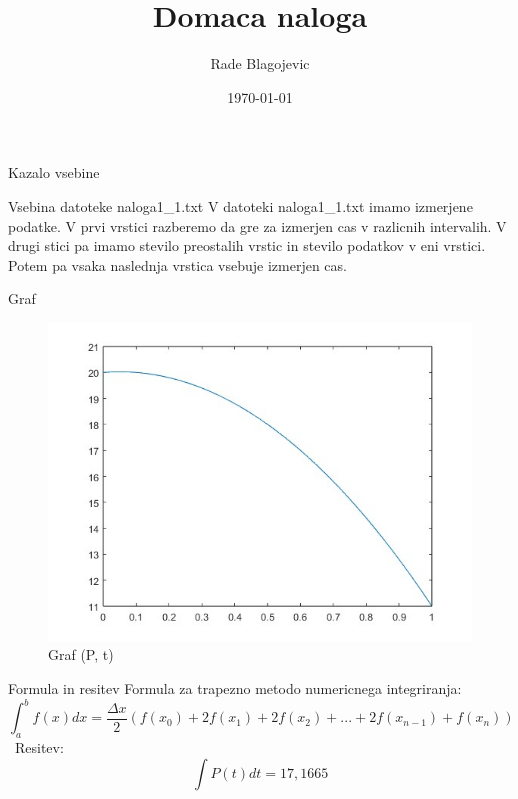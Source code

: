 \documentclass[svgnames]{beamer}
\title{\textbf{Domaca naloga}}
\author{Rade Blagojevic}
\date{\today}
\begin{document}
\frame{\titlepage}

\begin{frame}{Kazalo vsebine}
    \tableofcontents
\end{frame}

\begin{frame}{Vsebina datoteke naloga1\_1.txt}
V datoteki naloga1\_1.txt imamo izmerjene podatke. V prvi vrstici razberemo da gre za izmerjen cas v razlicnih intervalih. V drugi stici pa imamo stevilo preostalih vrstic in stevilo podatkov v eni vrstici. Potem pa vsaka naslednja vrstica vsebuje izmerjen cas.
\end{frame}

\begin{frame}{Graf}
\begin{figure}
    \centering
    \includegraphics[width=0.8\linewidth]{Graf.jpg}
    \caption{Graf (P, t)}
    \label{fig:enter-label}
\end{figure}
\end{frame}

\begin{frame}{Formula in resitev}
     Formula za trapezno metodo numericnega integriranja: 
    \[\int_a^b f(x)dx = \frac{\Delta x}{2} (f(x_0)+2f(x_1)+2f(x_2)+...+2f(x_{n-1})+f(x_n))\]\
    Resitev:
     \[\int P(t)dt = 17,1665\]\
\end{frame}
\end{document}
